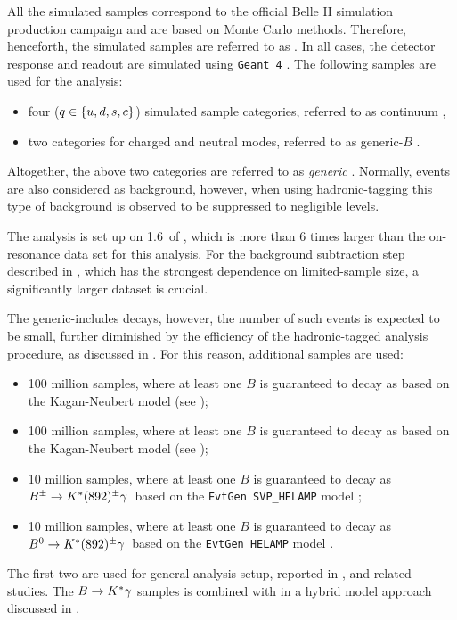 All the simulated samples correspond to the official Belle II simulation production campaign and are based on Monte Carlo methods.
Therefore, henceforth, the simulated samples are referred to as \MC.
In all cases, the detector response and readout are simulated using \texttt{Geant~4} \cite{GEANT4:2002zbu}.
The following samples are used for the analysis:
\begin{itemize}
    \item four \epem\ra\qqbar ($q\in\{u,d,s,c\}$) simulated sample categories, referred to as continuum \MC,
    \item two \FourS\ra\BB categories for charged and neutral \B modes, referred to as generic-$B$ \MC.
\end{itemize}
Altogether, the above two categories are referred to as \textit{generic} \MC.
Normally, \epem\ra\tautau events are also considered as background, however, when using hadronic-tagging this type of background is observed to be suppressed to negligible levels.

The analysis is set up on 1.6~\invab of \MC, which is more than 6 times larger than the on-resonance data set for this analysis.
For the background subtraction step described in , which has the strongest dependence on limited-\MC sample size, a significantly larger dataset is crucial.

The generic-\B \MC includes \BtoXsgamma decays, however, the number of such events is expected to be small, further diminished by the efficiency of the hadronic-tagged analysis procedure, as discussed in .
For this reason, additional samples are used:
\begin{itemize}
    \item 100 million \BpBm samples, where at least one $B$ is guaranteed to decay as \BptoXsgamma based on the Kagan-Neubert model \cite{Kagan:1998ym} (see );
    \item 100 million \BzBzb samples, where at least one $B$ is guaranteed to decay as \BztoXsgamma based on the Kagan-Neubert model \cite{Kagan:1998ym} (see );
    \item 10 million \BpBm samples, where at least one $B$ is guaranteed to decay as $B^\pm\rightarrow K^*(892)^{\pm}\gamma$~based on the \texttt{EvtGen SVP\_HELAMP} model \cite{Ryd:2005zz};
    \item 10 million \BzBzb samples, where at least one $B$ is guaranteed to decay as $B^0\rightarrow K^*(892)^{\pm}\gamma$~based on the \texttt{EvtGen HELAMP} model \cite{Ryd:2005zz}.
\end{itemize}
The first two are used for general analysis setup, reported in 
, and related studies.
The $B\rightarrow K^*\gamma$ samples is combined with \BtoXsgamma in a hybrid model approach \cite{Ramirez:1989yk} discussed in .

